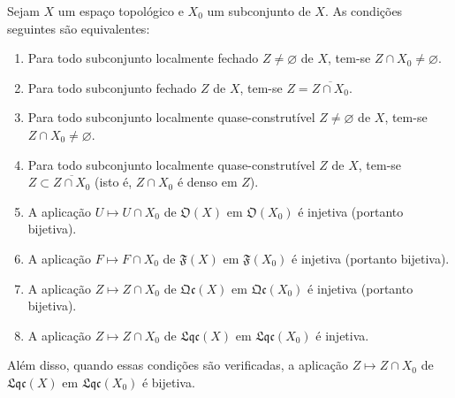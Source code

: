 \begin{proposition}[10.1.2]
\label{IV.10.1.2}
Sejam $X$ um espaço topológico e $X_0$ um subconjunto de $X$.
As condições seguintes são equivalentes:
\begin{enumerate}[label=\emph{\alph*)}]
  \item Para todo subconjunto localmente fechado $Z\neq\varnothing$ de $X$, tem-se $Z\cap X_0\neq\varnothing$.
  \item[\rm a$'$)] Para todo subconjunto fechado $Z$ de $X$, tem-se $Z=\overline{Z\cap X_0}$.
  \item Para todo subconjunto localmente quase-construtível $Z\neq\varnothing$ de $X$, tem-se $Z\cap X_0\neq\varnothing$.
  \item[\rm b$'$)] Para todo subconjunto localmente quase-construtível $Z$ de $X$, tem-se $Z\subset\overline{Z\cap X_0}$ (isto é, $Z\cap X_0$ é denso em $Z$).
  \item A aplicação $U\mapsto U\cap X_0$ de $\mathfrak{O}(X)$ em $\mathfrak{O}(X_0)$ é injetiva (portanto bijetiva).
  \item[\rm c$'$)] A aplicação $F\mapsto F\cap X_0$ de $\mathfrak{F}(X)$ em $\mathfrak{F}(X_0)$ é injetiva (portanto bijetiva).
  \item[\rm c$''$)] A aplicação $Z\mapsto Z\cap X_0$ de $\mathfrak{Qc}(X)$ em $\mathfrak{Qc}(X_0)$ é injetiva (portanto bijetiva).
  \item[\rm c$'''$)] A aplicação $Z\mapsto Z\cap X_0$ de $\mathfrak{Lqc}(X)$ em $\mathfrak{Lqc}(X_0)$ é injetiva.
\end{enumerate}
Além disso, quando essas condições são verificadas, a aplicação $Z\mapsto Z\cap X_0$ de $\mathfrak{Lqc}(X)$ em $\mathfrak{Lqc}(X_0)$ é bijetiva.
\end{proposition}

